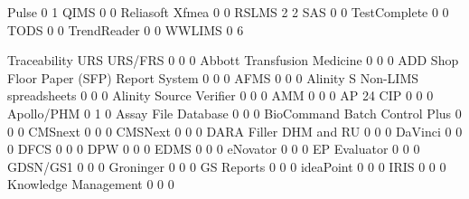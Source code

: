 \documentclass{article}
\begin{document}
\begin{Schunk}
\begin{Soutput}
  Pulse                                                0                     1
  QIMS                                                 0                     0
  Reliasoft Xfmea                                      0                     0
  RSLMS                                                2                     2
  SAS                                                  0                     0
  TestComplete                                         0                     0
  TODS                                                 0                     0
  TrendReader                                          0                     0
  WWLIMS                                               0                     6
                                          
                                           Traceability URS URS/FRS
                                                      0   0       0
  Abbott Transfusion Medicine                         0   0       0
  ADD Shop Floor Paper (SFP) Report System            0   0       0
  AFMS                                                0   0       0
  Alinity S Non-LIMS spreadsheets                     0   0       0
  Alinity Source Verifier                             0   0       0
  AMM                                                 0   0       0
  AP 24 CIP                                           0   0       0
  Apollo/PHM                                          0   1       0
  Assay File Database                                 0   0       0
  BioCommand Batch Control Plus                       0   0       0
  CMSnext                                             0   0       0
  CMSNext                                             0   0       0
  DARA Filler DHM and RU                              0   0       0
  DaVinci                                             0   0       0
  DFCS                                                0   0       0
  DPW                                                 0   0       0
  EDMS                                                0   0       0
  eNovator                                            0   0       0
  EP Evaluator                                        0   0       0
  GDSN/GS1                                            0   0       0
  Groninger                                           0   0       0
  GS Reports                                          0   0       0
  ideaPoint                                           0   0       0
  IRIS                                                0   0       0
  Knowledge Management                                0   0       0

\end{Soutput}
\end{Schunk}
\end{document}
